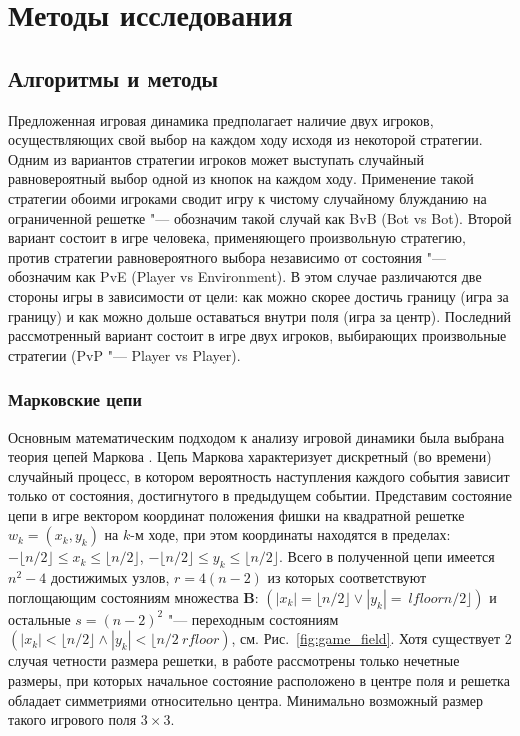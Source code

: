 \chapter{Методы исследования}\label{ch:ch2}

\section{Алгоритмы и методы}\label{sec:ch1/sec3}

Предложенная игровая динамика предполагает наличие двух игроков, осуществляющих свой выбор на каждом ходу исходя из некоторой стратегии.
Одним из вариантов стратегии игроков может выступать случайный равновероятный выбор одной из кнопок на каждом ходу.
Применение такой стратегии обоими игроками сводит игру к чистому случайному блужданию на ограниченной решетке "--- обозначим такой случай как BvB (Bot vs Bot).
Второй вариант состоит в игре человека, применяющего произвольную стратегию, против стратегии равновероятного выбора независимо от состояния "--- обозначим как PvE (Player vs Environment).
В этом случае различаются две стороны игры в зависимости от цели: как можно скорее достичь границу (игра за границу) и
как можно дольше оставаться внутри поля (игра за центр). Последний рассмотренный вариант состоит в игре двух игроков, 
выбирающих произвольные стратегии (PvP "--- Player vs Player).

\subsection{Марковские цепи}\label{subsec:ch1/sec3/sub1}

Основным математическим подходом к анализу игровой динамики была выбрана теория цепей Маркова \cite{markov_chain}.
Цепь Маркова характеризует дискретный (во времени) случайный процесс, в котором вероятность наступления каждого события 
зависит только от состояния, достигнутого в предыдущем событии. Представим состояние цепи в игре вектором координат 
положения фишки на квадратной решетке $w_k = (x_k, y_k)$ на $k$-м ходе, при этом координаты находятся в пределах: 
$-\lfloor n/2 \rfloor \leq x_k \leq \lfloor n/2 \rfloor$, $-\lfloor n/2 \rfloor \leq y_k \leq \lfloor n/2 \rfloor$. 
Всего в полученной цепи имеется $n^2-4$ достижимых узлов, $r=4(n-2)$ из которых соответствуют поглощающим состояниям множества $\textbf{B}$: 
$(|x_k|=\lfloor n/2 \rfloor \lor |y_k|=\ lfloor n/2 \rfloor)$ и остальные $s=(n-2)^2$ "--- переходным состояниям
$(|x_k|<\lfloor n/2 \rfloor \land |y_k|<\lfloor n/2 \ rfloor)$, см. Рис.~\cref{fig:game_field}. 
Хотя существует 2 случая четности размера решетки, в работе рассмотрены только нечетные размеры, при которых 
начальное состояние расположено в центре поля и решетка обладает симметриями относительно центра. 
Минимально возможный размер такого игрового поля $3\times 3$. 


